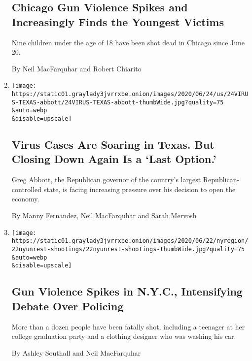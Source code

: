 \begin{enumerate}
{  \subsection{Chicago Gun Violence Spikes and Increasingly Finds the
  Youngest
  Victims}\label{chicago-gun-violence-spikes-and-increasingly-finds-the-youngest-victims}}

  Nine children under the age of 18 have been shot dead in Chicago since
  June 20.

  By Neil MacFarquhar and Robert Chiarito
\item
  \href{/2020/06/24/us/coronavirus-texas-abbott-masks.html}{}

  \texttt{[image: https://static01.graylady3jvrrxbe.onion/images/2020/06/24/us/24VIRUS-TEXAS-abbott/24VIRUS-TEXAS-abbott-thumbWide.jpg?quality=75\\\&auto=webp\\\&disable=upscale]}

  \hypertarget{virus-cases-are-soaring-in-texas-but-closing-down-again-is-a-last-option}{%
  \subsection{Virus Cases Are Soaring in Texas. But Closing Down Again
  Is a `Last
  Option.'}\label{virus-cases-are-soaring-in-texas-but-closing-down-again-is-a-last-option}}

  Greg Abbott, the Republican governor of the country's largest
  Republican-controlled state, is facing increasing pressure over his
  decision to open the economy.

  By Manny Fernandez, Neil MacFarquhar and Sarah Mervosh
\item
  \href{/2020/06/23/nyregion/nyc-shootings-surge.html}{}

  \texttt{[image: https://static01.graylady3jvrrxbe.onion/images/2020/06/22/nyregion/22nyunrest-shootings/22nyunrest-shootings-thumbWide.jpg?quality=75\\\&auto=webp\\\&disable=upscale]}

  \hypertarget{gun-violence-spikes-in-nyc-intensifying-debate-over-policing}{%
  \subsection{Gun Violence Spikes in N.Y.C., Intensifying Debate Over
  Policing}\label{gun-violence-spikes-in-nyc-intensifying-debate-over-policing}}

  More than a dozen people have been fatally shot, including a teenager
  at her college graduation party and a clothing designer who was
  washing his car.

  By Ashley Southall and Neil MacFarquhar
\end{enumerate}


